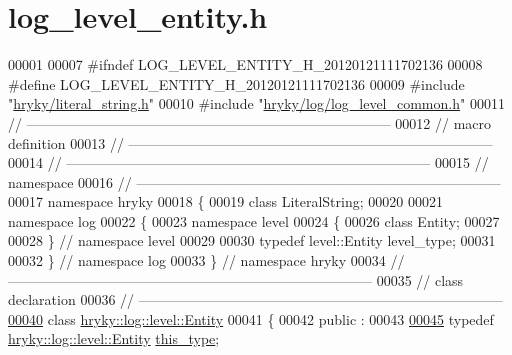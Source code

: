 \hypertarget{log__level__entity_8h_source}{\section{log\-\_\-level\-\_\-entity.\-h}
}

\begin{DoxyCode}
00001 
00007 \textcolor{preprocessor}{#ifndef LOG\_LEVEL\_ENTITY\_H\_20120121111702136}
00008 \textcolor{preprocessor}{}\textcolor{preprocessor}{#define LOG\_LEVEL\_ENTITY\_H\_20120121111702136}
00009 \textcolor{preprocessor}{}\textcolor{preprocessor}{#include "\hyperlink{literal__string_8h}{hryky/literal_string.h}"}
00010 \textcolor{preprocessor}{#include "\hyperlink{log__level__common_8h}{hryky/log/log_level_common.h}"}
00011 \textcolor{comment}{//
      ------------------------------------------------------------------------------}
00012 \textcolor{comment}{// macro definition}
00013 \textcolor{comment}{//
      ------------------------------------------------------------------------------}
00014 \textcolor{comment}{//
      ------------------------------------------------------------------------------}
00015 \textcolor{comment}{// namespace}
00016 \textcolor{comment}{//
      ------------------------------------------------------------------------------}
00017 \textcolor{keyword}{namespace }hryky
00018 \{
00019     \textcolor{keyword}{class }LiteralString;
00020     
00021 \textcolor{keyword}{namespace }log
00022 \{
00023 \textcolor{keyword}{namespace }level
00024 \{
00026     \textcolor{keyword}{class }Entity;
00027 
00028 \} \textcolor{comment}{// namespace level}
00029 
00030 \textcolor{keyword}{typedef} level::Entity level\_type;
00031 
00032 \} \textcolor{comment}{// namespace log}
00033 \} \textcolor{comment}{// namespace hryky}
00034 \textcolor{comment}{//
      ------------------------------------------------------------------------------}
00035 \textcolor{comment}{// class declaration}
00036 \textcolor{comment}{//
      ------------------------------------------------------------------------------}
\hypertarget{log__level__entity_8h_source_l00040}{}\hyperlink{classhryky_1_1log_1_1level_1_1_entity}{00040} \textcolor{comment}{}\textcolor{keyword}{class }\hyperlink{classhryky_1_1log_1_1level_1_1_entity}{hryky::log::level::Entity}
00041 \{
00042 \textcolor{keyword}{public} :
00043 
\hypertarget{log__level__entity_8h_source_l00045}{}\hyperlink{classhryky_1_1log_1_1level_1_1_entity_a0d62d1d88c70320c6187fc9580077fea}{00045}     \textcolor{keyword}{typedef} \hyperlink{classhryky_1_1log_1_1level_1_1_entity}{hryky::log::level::Entity} \hyperlink{classhryky_1_1log_1_1level_1_1_entity_a0d62d1d88c70320c6187fc9580077fea}{this_type};

\end{DoxyCode}
